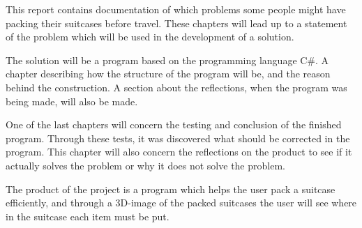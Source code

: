 This report contains documentation of which problems some people might have packing their suitcases before travel. These chapters will lead up to a statement of the problem which will be used in the development of a solution.


The solution will be a program based on the programming language C\#. A chapter describing how the structure of the program will be, and the reason behind the construction. A section about the reflections, when the program was being made, will also be made.


One of the last chapters will concern the testing and conclusion of the finished program. Through these tests, it was discovered what should be corrected in the program. This chapter will also concern the reflections on the product to see if it actually solves the problem or why it does not solve the problem.


The product of the project is a program which helps the user pack a suitcase efficiently, and through a 3D-image of the packed suitcases the user will see where in the suitcase each item must be put.